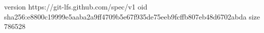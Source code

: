 version https://git-lfs.github.com/spec/v1
oid sha256:e8800c19999e5aaba2a9ff4709b5e67f935de75eeb9fcffb807eb48d6702abda
size 786528
